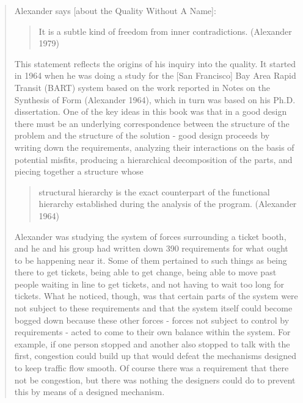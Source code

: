 \begin{quote}
Alexander says [about the Quality Without A Name]:
\begin{quote}
It is a subtle kind of freedom from inner contradictions. (Alexander 1979)                                                                          \end{quote}
This statement reflects the origins of his inquiry into the quality. It started in 1964 when he was doing a study for the [San Francisco] Bay Area Rapid Transit (BART) system based on the work reported in Notes on the Synthesis of Form (Alexander 1964), which in turn was based on his Ph.D. dissertation. One of the key ideas in this book was that in a good design there must be an underlying correspondence between the structure of the problem and the structure of the solution - good design proceeds by writing down the requirements, analyzing their interactions on the basis of potential misfits, producing a hierarchical decomposition of the parts, and piecing together a structure whose
\begin{quote}
structural hierarchy is the exact counterpart of the functional hierarchy established during the analysis of the program. (Alexander 1964)\end{quote} 
Alexander was studying the system of forces surrounding a ticket booth, and he and his group had written down 390 requirements for what ought to be happening near it. Some of them pertained to such things as being there to get tickets, being able to get change, being able to move past people waiting in line to get tickets, and not having to wait too long for tickets. What he noticed, though, was that certain parts of the system were not subject to these requirements and that the system itself could become bogged down because these other forces - forces not subject to control by requirements - acted to come to their own balance within the system. For example, if one person stopped and another also stopped to talk with the first, congestion could build up that would defeat the mechanisms designed to keep traffic flow smooth. Of course there was a requirement that there not be congestion, but there was nothing the designers could do to prevent this by means of a designed mechanism.                                                                                                                                                                                                                                                                                                                                                                                                                                                                                                                                                                                                                                                                                                                                                                                                                                                                                                                                                                                                                                 \end{quote} 
